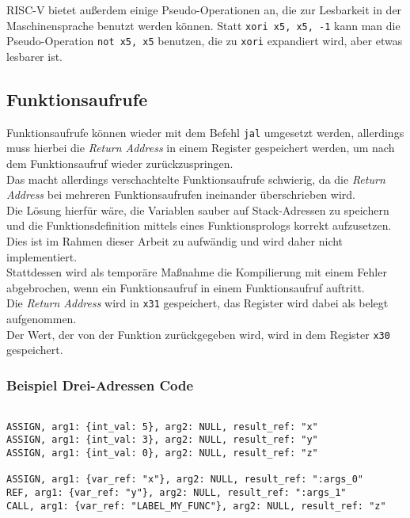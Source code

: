RISC-V bietet außerdem einige Pseudo-Operationen an, die zur Lesbarkeit in der Maschinensprache benutzt werden können.
Statt \texttt{xori x5, x5, -1} kann man die Pseudo-Operation \texttt{not x5, x5} benutzen, die zu \texttt{xori} expandiert wird, aber etwas lesbarer ist.\\


\subsection{Funktionsaufrufe}

Funktionsaufrufe können wieder mit dem Befehl \texttt{jal} umgesetzt werden, allerdings muss hierbei die \textit{Return Address} in einem Register gespeichert werden, um nach dem Funktionsaufruf wieder zurückzuspringen.\\
Das macht allerdings verschachtelte Funktionsaufrufe schwierig, da die \textit{Return Address} bei mehreren Funktionsaufrufen ineinander überschrieben wird.\\
Die Lösung hierfür wäre, die Variablen sauber auf Stack-Adressen zu speichern und die Funktionsdefinition mittels eines Funktionsprologs korrekt aufzusetzen.
Dies ist im Rahmen dieser Arbeit zu aufwändig und wird daher nicht implementiert.\\
Stattdessen wird als temporäre Maßnahme die Kompilierung mit einem Fehler abgebrochen, wenn ein Funktionsaufruf in einem Funktionsaufruf auftritt.\\
Die \textit{Return Address} wird in \texttt{x31} gespeichert, das Register wird dabei als belegt aufgenommen.\\
Der Wert, der von der Funktion zurückgegeben wird, wird in dem Register \texttt{x30} gespeichert.\\

\subsubsection{Beispiel Drei-Adressen Code}

\begin{lstlisting}[caption={Drei-Adressen Code Funktionsaufruf}]

ASSIGN, arg1: {int_val: 5}, arg2: NULL, result_ref: "x"
ASSIGN, arg1: {int_val: 3}, arg2: NULL, result_ref: "y"
ASSIGN, arg1: {int_val: 0}, arg2: NULL, result_ref: "z"

ASSIGN, arg1: {var_ref: "x"}, arg2: NULL, result_ref: ":args_0"
REF, arg1: {var_ref: "y"}, arg2: NULL, result_ref: ":args_1"
CALL, arg1: {var_ref: "LABEL_MY_FUNC"}, arg2: NULL, result_ref: "z"

\end{lstlisting}

